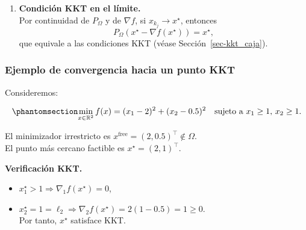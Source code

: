 \documentclass[
  spanish,
  us-letterpaper,
]{scrreprt}
\providecommand{\tightlist}{%
  \setlength{\itemsep}{0pt}\setlength{\parskip}{0pt}}
\numberwithin{equation}{section}
\begin{document}
\begin{enumerate}
  En el caso del gradiente proyectado, la dirección de búsqueda se
  define como
  \(d_k = P_\Omega(x_k - \nabla f(x_k)) - x_k = \nabla_\Omega f(x_k)\).
  Una propiedad fundamental de la proyección ortogonal sobre un conjunto
  convexo es que satisface la desigualdad variacional \[
  (x_k - \nabla f(x_k) - (x_k + d_k))^\top (x - (x_k + d_k)) \le 0, \quad \forall x \in \Omega,
  \] la cual implica, en particular, que
  \begin{equation}\phantomsection\label{eq-69}{
  \nabla f(x_k)^\top d_k = -\|d_k\|^2. 
  }\end{equation} Sustituyendo en Ecuación~\ref{eq-wol}, obtenemos \[
  \sum_{k=0}^\infty \|d_k\|^2 < \infty.
  \] Esta serie convergente implica que \(\|d_k\| \to 0\) cuando
  \(k \to \infty\). Dado que \(d_k = \nabla_\Omega f(x_k)\), se concluye
  que \[
  \lim_{k \to \infty} \|\nabla_\Omega f(x_k)\| = 0,
  \] lo cual refuerza Ecuación~\ref{eq-liminf} y completa este paso del
  argumento.
\item
  \textbf{Condición KKT en el límite.}\\
  Por continuidad de \(P_\Omega\) y de \(\nabla f\), si
  \(x_{k_j} \to x^\star\), entonces \[
  P_\Omega(x^\star - \nabla f(x^\star)) = x^\star,
  \] que equivale a las condiciones KKT (véase
  Sección~\ref{sec-kkt_caja}).
\end{enumerate}

\subsubsection{Ejemplo de convergencia hacia un punto
KKT}\label{ejemplo-de-convergencia-hacia-un-punto-kkt}

Consideremos:

\begin{equation}\phantomsection\label{eq-70}{
\min_{x \in \mathbb{R}^2} f(x) = (x_1 - 2)^2 + (x_2 - 0.5)^2
\quad \text{sujeto a } x_1 \ge 1,\, x_2 \ge 1. 
}\end{equation}

El minimizador irrestricto es
\(x^{\text{free}} = (2, 0.5)^\top \notin \Omega\).\\
El punto más cercano factible es \(x^\star = (2,1)^\top\).

\textbf{Verificación KKT.}

\begin{itemize}
\tightlist
\item
  \(x_1^\star > 1 \Rightarrow \nabla_1 f(x^\star) = 0\),\\
\item
  \(x_2^\star = 1 = \ell_2 \Rightarrow \nabla_2 f(x^\star) = 2(1 - 0.5) = 1 \ge 0\).\\
  Por tanto, \(x^\star\) satisface KKT.
\end{itemize}
\end{document}
